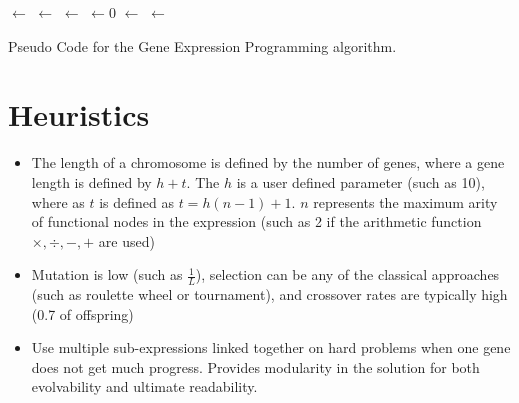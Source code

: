 \documentclass[a4paper, 11pt]{article}
\begin{document}
\begin{algorithm}[htp]
	\KwIn{\Grammar, \PopulationSize, \HeadLength, \TailLength, \ProbabilityCrossover, \ProbabilityMutate}		
	\KwOut{\Best}
	\Population $\leftarrow$ \InitializePopulation{\PopulationSize, \Grammar, \HeadLength, \TailLength}\;
	\ForEach{\Solution $\in$ \Population}{
		\SolutionProgram $\leftarrow$ \Map{\SolutionGenome, \Grammar}\;
		\SolutionCost $\leftarrow$ \Execute{\SolutionProgram}\;
	}
	\Best $\leftarrow$ \GetBestSolution{\Population}\;
	\While{$\neg$\StopCondition{}} {
		\Parents $\leftarrow$ \SelectParents{\Population, \PopulationSize}\;
		\Children $\leftarrow 0$\;
		\ForEach{\ParentOne, \ParentTwo $\in$ \Parents}{
			\SolutionGenome $\leftarrow$ \Crossover{\ParentOne, \ParentTwo, \ProbabilityCrossover}\;
			\SolutionGenome $\leftarrow$ \Mutate{\SolutionGenome, \ProbabilityMutate}\;
			\Children $\leftarrow$ \Solution\;
		}
		\ForEach{\Solution $\in$ \Population}{
			\SolutionProgram $\leftarrow$ \Map{\SolutionGenome, \Grammar}\;
			\SolutionCost $\leftarrow$ \Execute{\SolutionProgram}\;
		}
		\Best $\leftarrow$ \GetBestSolution{\Children}\;
		\Population $\leftarrow$ \Replace{\Population, \Children}\;
	}
	\Return{\Best}\;
	\caption{Pseudo Code for the Gene Expression Programming algorithm.}
	\label{alg:gene_expression_programming}
\end{algorithm}


\section{Heuristics}
\label{sec:heuristics}
\begin{itemize}
	\item The length of a chromosome is defined by the number of genes, where a gene length is defined by $h + t$. The $h$ is a user defined parameter (such as 10), where as $t$ is defined as $t = h (n-1) + 1$. $n$ represents the maximum arity of functional nodes in the expression (such as 2 if the arithmetic function $\times, \div, -, +$ are used)
	\item Mutation is low (such as $\frac{1}{L}$), selection can be any of the classical approaches (such as roulette wheel or tournament), and crossover rates are typically high (0.7 of offspring)
	\item Use multiple sub-expressions linked together on hard problems when one gene does not get much progress. Provides modularity in the solution for both evolvability and ultimate readability.
\end{itemize}
\end{document}
